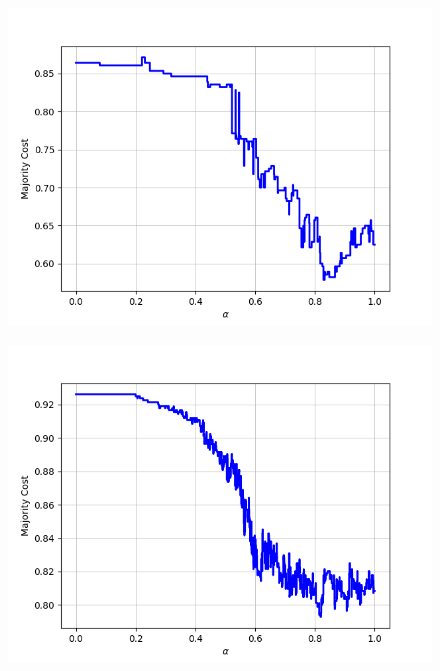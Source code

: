 \begin{figure}[H]
\begin{minipage}{.24\textwidth}
  {\includegraphics[width=\linewidth]{plots/omniglot-intra-sc/N_Ko}}
\end{minipage}
\begin{minipage}{.24\textwidth}
  \centering
  {\includegraphics[width=\linewidth]{plots/omniglot-intra-sc/Ojibwe_(Canadian_Aboriginal_Syllabics)}}
\end{minipage}
\begin{minipage}{.24\textwidth}
  \centering

\end{minipage}
\end{figure}
